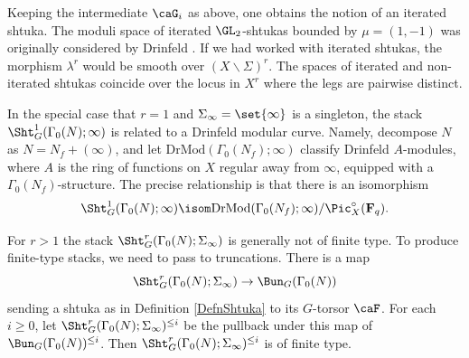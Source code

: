 \documentclass{article}
\def\F{\mathbf{F}}
\begin{document}
\begin{rmk} Keeping the intermediate $\caG_i$ as above, one obtains the notion of an iterated shtuka.  The moduli space of iterated $\GL_2$-shtukas bounded by $\mu=(1,-1)$ was originally considered by Drinfeld \cite{DrinfeldLanglandsConjectureForGL2}.  If we had worked with iterated shtukas, the morphism $\lambda^r$ would be smooth over $(X\smallsetminus \Sigma)^r$.  The spaces of iterated and non-iterated shtukas coincide over the locus in $X^r$ where the legs are pairwise distinct.  
\end{rmk}



\begin{ex}
In the special case that $r=1$ and $\Sigma_\infty=\set{\infty}$ is a singleton, the stack $\Sht^1_G(\Gamma_0(N);\infty)$ is related to a Drinfeld modular curve.  Namely,  decompose $N$ as $N=N_f+(\infty)$, and let $\mathrm{DrMod}(\Gamma_0(N_f);\infty)$ classify Drinfeld $A$-modules, where $A$ is the ring of functions on $X$ regular away from $\infty$, equipped with a $\Gamma_0(N_f)$-structure.     The precise relationship is that there is an isomorphism
\[ \Sht^1_G(\Gamma_0(N);\infty) \isom 
\mathrm{DrMod}(\Gamma_0(N_f);\infty)/\Pic^\circ_X(\F_q).\]
\end{ex}

For $r>1$ the stack $\Sht_G^r(\Gamma_0(N);\Sigma_\infty)$ is generally not of finite type.  To produce finite-type stacks, we need to pass to truncations.   There is a map 
\[ \Sht_G^r(\Gamma_0(N);\Sigma_\infty) \to \Bun_G(\Gamma_0(N))\]
sending a shtuka as in Definition \ref{DefnShtuka} to its $G$-torsor $\caF$.    For each $i\geq 0$, let $\Sht_G^r(\Gamma_0(N);\Sigma_\infty)^{\leq i}$ be the pullback under this map of $\Bun_G(\Gamma_0(N))^{\leq i}$.  Then $\Sht_G^r(\Gamma_0(N);\Sigma_\infty)^{\leq i}$ is of finite type.  

\end{document}
